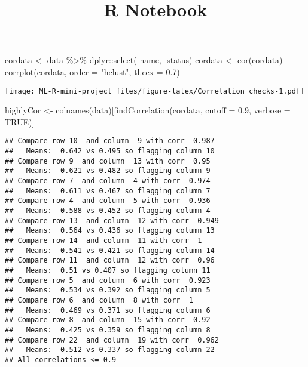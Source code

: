 \documentclass[
]{article}
\title{R Notebook}
\author{}
\date{\vspace{-2.5em}}
\newenvironment{Shaded}{\begin{snugshade}}{\end{snugshade}}
\newcommand{\AttributeTok}[1]{\textcolor[rgb]{0.77,0.63,0.00}{#1}}
\newcommand{\ConstantTok}[1]{\textcolor[rgb]{0.00,0.00,0.00}{#1}}
\newcommand{\FloatTok}[1]{\textcolor[rgb]{0.00,0.00,0.81}{#1}}
\newcommand{\FunctionTok}[1]{\textcolor[rgb]{0.00,0.00,0.00}{#1}}
\newcommand{\NormalTok}[1]{#1}
\newcommand{\OtherTok}[1]{\textcolor[rgb]{0.56,0.35,0.01}{#1}}
\newcommand{\SpecialCharTok}[1]{\textcolor[rgb]{0.00,0.00,0.00}{#1}}
\newcommand{\StringTok}[1]{\textcolor[rgb]{0.31,0.60,0.02}{#1}}
\begin{document}
\maketitle

\begin{Shaded}
\begin{Highlighting}[]
\NormalTok{cordata }\OtherTok{\textless{}{-}}\NormalTok{ data }\SpecialCharTok{\%\textgreater{}\%}\NormalTok{ dplyr}\SpecialCharTok{::}\FunctionTok{select}\NormalTok{(}\SpecialCharTok{{-}}\NormalTok{name, }\SpecialCharTok{{-}}\NormalTok{status)}
\NormalTok{cordata }\OtherTok{\textless{}{-}} \FunctionTok{cor}\NormalTok{(cordata)}
\FunctionTok{corrplot}\NormalTok{(cordata, }\AttributeTok{order =} \StringTok{"hclust"}\NormalTok{, }\AttributeTok{tl.cex =} \FloatTok{0.7}\NormalTok{)}
\end{Highlighting}
\end{Shaded}

\texttt{[image: ML-R-mini-project\_files/figure-latex/Correlation checks-1.pdf]}

\begin{Shaded}
\begin{Highlighting}[]
\NormalTok{highlyCor }\OtherTok{\textless{}{-}} \FunctionTok{colnames}\NormalTok{(data)[}\FunctionTok{findCorrelation}\NormalTok{(cordata, }\AttributeTok{cutoff =} \FloatTok{0.9}\NormalTok{, }\AttributeTok{verbose =} \ConstantTok{TRUE}\NormalTok{)]}
\end{Highlighting}
\end{Shaded}

\begin{verbatim}
## Compare row 10  and column  9 with corr  0.987 
##   Means:  0.642 vs 0.495 so flagging column 10 
## Compare row 9  and column  13 with corr  0.95 
##   Means:  0.621 vs 0.482 so flagging column 9 
## Compare row 7  and column  4 with corr  0.974 
##   Means:  0.611 vs 0.467 so flagging column 7 
## Compare row 4  and column  5 with corr  0.936 
##   Means:  0.588 vs 0.452 so flagging column 4 
## Compare row 13  and column  12 with corr  0.949 
##   Means:  0.564 vs 0.436 so flagging column 13 
## Compare row 14  and column  11 with corr  1 
##   Means:  0.541 vs 0.421 so flagging column 14 
## Compare row 11  and column  12 with corr  0.96 
##   Means:  0.51 vs 0.407 so flagging column 11 
## Compare row 5  and column  6 with corr  0.923 
##   Means:  0.534 vs 0.392 so flagging column 5 
## Compare row 6  and column  8 with corr  1 
##   Means:  0.469 vs 0.371 so flagging column 6 
## Compare row 8  and column  15 with corr  0.92 
##   Means:  0.425 vs 0.359 so flagging column 8 
## Compare row 22  and column  19 with corr  0.962 
##   Means:  0.512 vs 0.337 so flagging column 22 
## All correlations <= 0.9
\end{verbatim}
\end{document}
